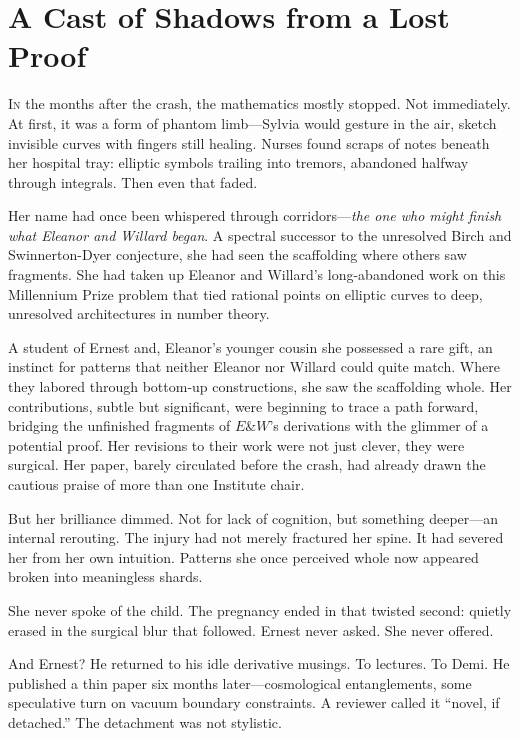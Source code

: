 \section*{A Cast of Shadows from a Lost Proof}

\lettrine{I}n the months after the crash, the mathematics mostly stopped. Not immediately. At first, it was a form of phantom limb—Sylvia would gesture in the air, sketch invisible curves with fingers still healing. Nurses found scraps of notes beneath her hospital tray: elliptic symbols trailing into tremors, abandoned halfway through integrals. Then even that faded.

Her name had once been whispered through corridors—\textit{the one who might finish what Eleanor and Willard began}. A spectral successor to the unresolved Birch and Swinnerton-Dyer conjecture, she had seen the scaffolding where others saw fragments. She had taken up Eleanor and Willard’s long-abandoned work on this Millennium Prize problem that tied rational points on elliptic curves to deep, unresolved architectures in number theory. 

A student of Ernest and, Eleanor’s younger cousin she possessed a rare gift, an instinct for patterns that neither Eleanor nor Willard could quite match. Where they labored through bottom-up constructions, she saw the scaffolding whole.  
Her contributions, subtle but significant, were beginning to trace a path forward, bridging the unfinished fragments of \(E \& W\)'s derivations with the glimmer of a potential proof. Her revisions to their work were not just clever, they were surgical. Her paper, barely circulated before the crash, had already drawn the cautious praise of more than one Institute chair.

But her brilliance dimmed. Not for lack of cognition, but something deeper—an internal rerouting. The injury had not merely fractured her spine. It had severed her from her own intuition. Patterns she once perceived whole now appeared broken into meaningless shards.

\bigskip

She never spoke of the child. The pregnancy ended in that twisted second: quietly erased in the surgical blur that followed. Ernest never asked. She never offered.

\bigskip

And Ernest? He returned to his idle derivative musings. To lectures. To Demi. He published a thin paper six months later—cosmological entanglements, some speculative turn on vacuum boundary constraints. A reviewer called it “novel, if detached.” The detachment was not stylistic.

